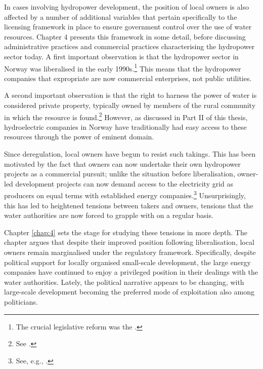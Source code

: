 In cases involving hydropower development, the position of local owners is also affected by a number of additional variables that pertain specifically to the licensing framework in place to ensure government control over the use of water resources. Chapter 4 presents this framework in some detail, before discussing administrative practices and commercial practices characterising the hydropower sector today. A first important observation is that the hydropower sector in Norway was liberalised in the early 1990s.\footnote{The crucial legislative reform was the \cite{ea90}.} This means that the hydropower companies that expropriate are now commercial enterprises, not public utilities.

A second important observation is that the right to harness the power of water is considered private property, typically owned by members of the rural community in which the resource is found.\footnote{See \cite[13]{wra00}.} However, as discussed in Part II of this thesis, hydroelectric companies in Norway have traditionally had easy access to these resources through the power of eminent domain.

Since deregulation, local owners have begun to resist such takings. This has been motivated by the fact that owners can now undertake their own hydropower projects as a commercial pursuit; unlike the situation before liberalisation, owner-led development projects can now demand access to the electricity grid as producers on equal terms with established energy companies.\footnote{See, e.g., \cite{uleberg08}.} Unsurprisingly, this has led to heightened tensions between takers and owners, tensions that the water authorities are now forced to grapple with on a regular basis.


Chapter \ref{chap:4} sets the stage for studying these tensions in more depth. The chapter argues that despite their improved position following liberalisation, local owners remain marginalised under the regulatory framework. Specifically, despite political support for locally organised small-scale development, the large energy companies have continued to enjoy a privileged position in their dealings with the water authorities. Lately, the political narrative appears to be changing, with large-scale development becoming the preferred mode of exploitation also among politicians.


